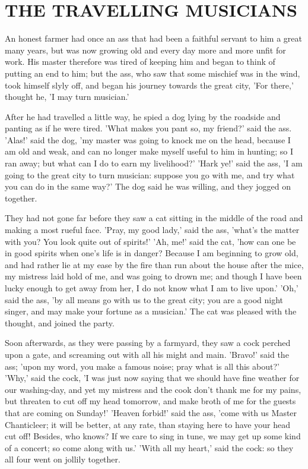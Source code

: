 \documentclass[12pt]{book}
\begin{document}
\chapter{THE TRAVELLING MUSICIANS}

An honest farmer had once an ass that had been a faithful servant to
him a great many years, but was now growing old and every day more and
more unfit for work. His master therefore was tired of keeping him and
began to think of putting an end to him; but the ass, who saw that
some mischief was in the wind, took himself slyly off, and began his
journey towards the great city, 'For there,' thought he, 'I may turn
musician.'

After he had travelled a little way, he spied a dog lying by the
roadside and panting as if he were tired. 'What makes you pant so, my
friend?' said the ass. 'Alas!' said the dog, 'my master was going to
knock me on the head, because I am old and weak, and can no longer
make myself useful to him in hunting; so I ran away; but what can I do
to earn my livelihood?' 'Hark ye!' said the ass, 'I am going to the
great city to turn musician: suppose you go with me, and try what you
can do in the same way?' The dog said he was willing, and they jogged
on together.

They had not gone far before they saw a cat sitting in the middle of
the road and making a most rueful face. 'Pray, my good lady,' said the
ass, 'what's the matter with you? You look quite out of spirits!' 'Ah,
me!' said the cat, 'how can one be in good spirits when one's life is
in danger? Because I am beginning to grow old, and had rather lie at
my ease by the fire than run about the house after the mice, my
mistress laid hold of me, and was going to drown me; and though I have
been lucky enough to get away from her, I do not know what I am to
live upon.' 'Oh,' said the ass, 'by all means go with us to the great
city; you are a good night singer, and may make your fortune as a
musician.' The cat was pleased with the thought, and joined the party.

Soon afterwards, as they were passing by a farmyard, they saw a cock
perched upon a gate, and screaming out with all his might and main.
'Bravo!' said the ass; 'upon my word, you make a famous noise; pray
what is all this about?' 'Why,' said the cock, 'I was just now saying
that we should have fine weather for our washing-day, and yet my
mistress and the cook don't thank me for my pains, but threaten to cut
off my head tomorrow, and make broth of me for the guests that are
coming on Sunday!' 'Heaven forbid!' said the ass, 'come with us Master
Chanticleer; it will be better, at any rate, than staying here to have
your head cut off! Besides, who knows? If we care to sing in tune, we
may get up some kind of a concert; so come along with us.' 'With all
my heart,' said the cock: so they all four went on jollily together.
\end{document}
